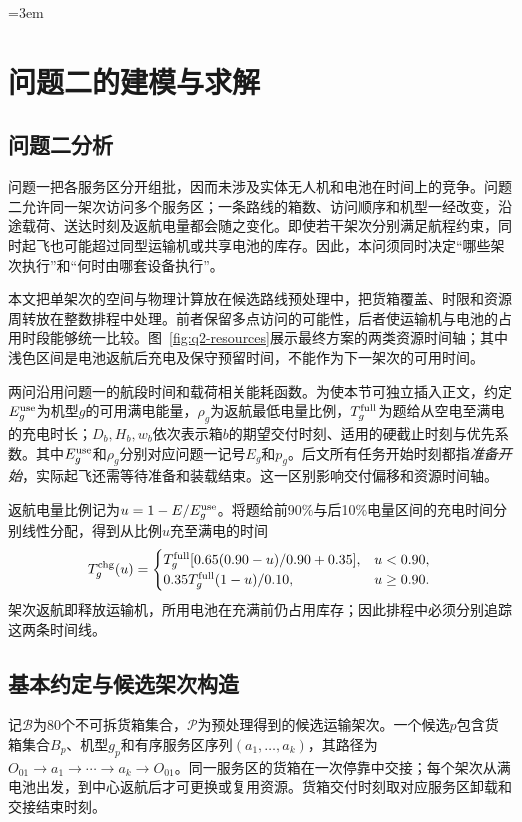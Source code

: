\emergencystretch=3em
\section{问题二的建模与求解}
\subsection{问题二分析}
问题一把各服务区分开组批，因而未涉及实体无人机和电池在时间上的竞争。问题二允许同一架次访问多个服务区；一条路线的箱数、访问顺序和机型一经改变，沿途载荷、送达时刻及返航电量都会随之变化。即使若干架次分别满足航程约束，同时起飞也可能超过同型运输机或共享电池的库存。因此，本问须同时决定“哪些架次执行”和“何时由哪套设备执行”。

本文把单架次的空间与物理计算放在候选路线预处理中，把货箱覆盖、时限和资源周转放在整数排程中处理。前者保留多点访问的可能性，后者使运输机与电池的占用时段能够统一比较。图~\ref{fig:q2-resources}展示最终方案的两类资源时间轴；其中浅色区间是电池返航后充电及保守预留时间，不能作为下一架次的可用时间。

两问沿用问题一的航段时间和载荷相关能耗函数。为使本节可独立插入正文，约定$E_g^{\rm use}$为机型$g$的可用满电能量，$\rho_g$为返航最低电量比例，$T_g^{\rm full}$为题给从空电至满电的充电时长；$D_b,H_b,w_b$依次表示箱$b$的期望交付时刻、适用的硬截止时刻与优先系数。其中$E_g^{\rm use}$和$\rho_g$分别对应问题一记号$E_g$和$p_g$。后文所有任务开始时刻都指\emph{准备开始}，实际起飞还需等待准备和装载结束。这一区别影响交付偏移和资源时间轴。

返航电量比例记为$u=1-E/E_g^{\rm use}$。将题给前90\%与后10\%电量区间的充电时间分别线性分配，得到从比例$u$充至满电的时间
\begin{equation}
T_g^{\rm chg}(u)=
\begin{cases}
T_g^{\rm full}[0.65(0.90-u)/0.90+0.35],&u<0.90,\\
0.35T_g^{\rm full}(1-u)/0.10,&u\geq0.90.
\end{cases}
\label{eq:q2-charge}
\end{equation}
架次返航即释放运输机，所用电池在充满前仍占用库存；因此排程中必须分别追踪这两条时间线。

\subsection{基本约定与候选架次构造}
记$\mathcal B$为80个不可拆货箱集合，$\mathcal P$为预处理得到的候选运输架次。一个候选$p$包含货箱集合$B_p$、机型$g_p$和有序服务区序列$(a_1,\ldots,a_k)$，其路径为$O_{01}\to a_1\to\cdots\to a_k\to O_{01}$。同一服务区的货箱在一次停靠中交接；每个架次从满电池出发，到中心返航后才可更换或复用资源。货箱交付时刻取对应服务区卸载和交接结束时刻。

